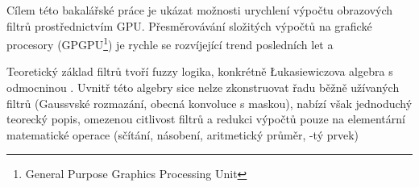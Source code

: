 


Cílem této bakalářské práce je ukázat možnosti urychlení výpočtu obrazových filtrů
prostřednictvím GPU. Přesměrovávání složitých výpočtů na grafické procesory
(GPGPU\footnote{General Purpose Graphics Processing Unit}) je rychle se rozvíjející
trend posledních let a

Teoretický základ filtrů tvoří fuzzy logika, konkrétně \L ukasiewiczova algebra s
odmocninou \cite{MajerovaPhD}. Uvnitř této algebry sice nelze zkonstruovat řadu
běžně užívaných filtrů (Gaussvské rozmazání, obecná konvoluce s maskou), nabízí však
jednoduchý teorecký popis, omezenou citlivost filtrů a redukci výpočtů pouze na
elementární matematické operace (sčítání, násobení, aritmetický průměr, \kk-tý prvek)
